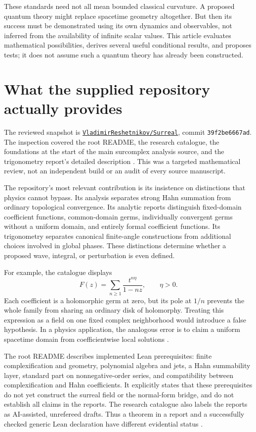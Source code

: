 \documentclass[11pt,a4paper]{article}
\numberwithin{equation}{section}
\theoremstyle{definition}
\theoremstyle{remark}
\newcommand{\repo}{\href{https://github.com/VladimirReshetnikov/Surreal/tree/39f2be6667ade51bca2b45daa47e289d69c09764}{\texttt{VladimirReshetnikov/Surreal}}}
\begin{document}
These standards need not all mean bounded classical curvature. A proposed quantum theory might replace spacetime geometry altogether. But then its success must be demonstrated using its own dynamics and observables, not inferred from the availability of infinite scalar values. This article evaluates mathematical possibilities, derives several useful conditional results, and proposes tests; it does not assume such a quantum theory has already been constructed.

\section{What the supplied repository actually provides}
\label{sec:repo}

The reviewed snapshot is \repo, commit \texttt{39f2be6667ad}. The inspection covered the root README, the research catalogue, the foundations at the start of the main surcomplex analysis source, and the trigonometry report's detailed description \cite{Repo,RepoAnalysis,RepoTrig}. This was a targeted mathematical review, not an independent build or an audit of every source manuscript.

The repository's most relevant contribution is its insistence on distinctions that physics cannot bypass. Its analysis separates strong Hahn summation from ordinary topological convergence. Its analytic reports distinguish fixed-domain coefficient functions, common-domain germs, individually convergent germs without a uniform domain, and entirely formal coefficient functions. Its trigonometry separates canonical finite-angle constructions from additional choices involved in global phases. These distinctions determine whether a proposed wave, integral, or perturbation is even defined.

For example, the catalogue displays
\begin{equation}
 F(z)=\sum_{n\geq 1}\frac{t^{n\eta}}{1-nz},\qquad \eta>0.
\end{equation}
Each coefficient is a holomorphic germ at zero, but its pole at $1/n$ prevents the whole family from sharing an ordinary disk of holomorphy. Treating this expression as a field on one fixed complex neighborhood would introduce a false hypothesis. In a physics application, the analogous error is to claim a uniform spacetime domain from coefficientwise local solutions \cite{Repo}.

The root README describes implemented Lean prerequisites: finite complexification and geometry, polynomial algebra and jets, a Hahn summability layer, standard part on nonnegative-order series, and compatibility between complexification and Hahn coefficients. It explicitly states that these prerequisites do not yet construct the surreal field or the normal-form bridge, and do not establish all claims in the reports. The research catalogue also labels the reports as AI-assisted, unrefereed drafts. Thus a theorem in a report and a successfully checked generic Lean declaration have different evidential status \cite{Repo}.
\end{document}
